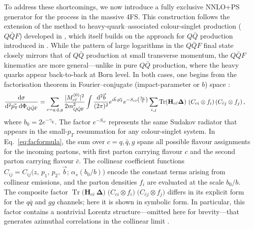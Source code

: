 \documentclass[11pt,a4paper]{article}
\DeclareMathOperator{\Tr}{Tr}
\begin{document}
To address these shortcomings, we now introduce a fully exclusive NNLO+PS generator for the \bbH{} process in the massive 4FS.  This construction follows the extension of the \minnlo{} method to heavy-quark–associated colour-singlet production (\(Q\bar{Q}F\)) developed in \cite{mazzitelli:2024ura}, which itself builds on the \minnlo{} approach for \(Q\bar{Q}\) production introduced in \cite{mazzitelli:2020jio,mazzitelli:2021mmm}.  While the pattern of large logarithms in the \(Q\bar{Q}F\) final state closely mirrors that of \(Q\bar{Q}\) production at small transverse momentum, the \(Q\bar{Q}F\) kinematics are more general—unlike in pure \(Q\bar{Q}\) production, where the heavy quarks appear back-to-back at Born level.  In both cases, one begins from the factorisation theorem in Fourier–conjugate (impact-parameter or \(b\)) space \cite{Zhu:2012ts,Li:2013mia,Catani:2014qha,Catani:2018mei}:
\begin{align}\label{eq:facformula}
        \frac{\mathd \sigma}{ \mathd^2\vec{\pt}\, \mathd \Phi_{Q\bar{Q}{\rm F}}}&=\sum_{c=q,\bar{q},g}
  \frac{|M^{(0)}_{c\bar{c}}|^2}{2 m_{Q\bar{Q}{\rm F}}^2 }\int\frac{ \mathd^2\vec{b}}{(2\pi)^2} e^{i \vec{b}\cdot
  \vec{\pt} } e^{-S_{c\bar{c}} \left(\frac{b_0}{b}\right)}\sum_{i,j} \Tr({\mathbf H}_{c\bar{c}}{\mathbf \Delta})\,\,
  ({C}_{ci}\otimes f_i) \,({C}_{\bar{c} j}\otimes f_j) \,,
\end{align}
where $b_0=2 e^{-\gamma_\text{E}}$. The factor $e^{-S_{c\bar{c}}}$ represents the same Sudakov radiator that appears in the small-$p_{T}$ resummation for any colour-singlet system.  In Eq.~\eqref{eq:facformula}, the sum over $c=q,\bar{q},g$ spans all possible flavour assignments for the incoming partons, with first parton carrying flavour $c$ and the second parton carrying flavour $\bar{c}$. The collinear coefficient functions
$C_{ij} = C_{ij}\bigl(z,\,p_{1},\,p_{2},\,\vec{b};\,\alpha_{s}(b_{0}/b)\bigr)$
encode the constant terms arising from collinear emissions, and the parton densities $f_{i}$ are evaluated at the scale $b_{0}/b$.  The composite factor
$\Tr\bigl({\mathbf H}_{c\bar{c}}\,{\mathbf \Delta}\bigr)\;\bigl(C_{ci}\otimes f_{i}\bigr)\;\bigl(C_{\bar{c}j}\otimes f_{j}\bigr)$
differs in its explicit form for the $q\bar{q}$ and $gg$ channels; here it is shown in symbolic form.  In particular, this factor contains a nontrivial Lorentz structure—omitted here for brevity—that generates azimuthal correlations in the collinear limit \cite{Catani:2010pd,Catani:2014qha}.
\end{document}
